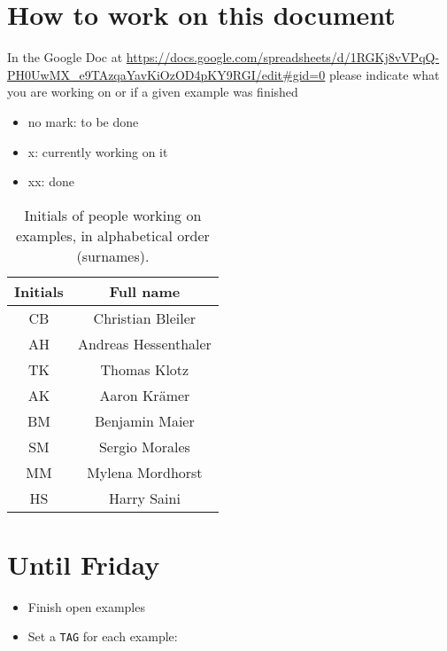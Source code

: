 %
\section{How to work on this document}
%
In the Google Doc at
\url{https://docs.google.com/spreadsheets/d/1RGKj8vVPqQ-PH0UwMX_e9TAzqaYavKiOzOD4pKY9RGI/edit#gid=0}
please indicate what you are working on or if a given example was finished
%
\begin{itemize}
    \item{no mark: to be done}
    \item{x: currently working on it}
    \item{xx: done}
\end{itemize}
%
\begin{table}[h!]
    \centering
    \begin{tabular}{ c | c }
        Initials & Full name \\
        \midrule
        CB       & Christian Bleiler \\
        AH       & Andreas Hessenthaler \\
        TK       & Thomas Klotz \\
        AK       & Aaron Kr\"amer \\
        BM       & Benjamin Maier \\
        SM       & Sergio Morales \\
        MM       & Mylena Mordhorst \\
        HS       & Harry Saini \\
    \end{tabular}
    \caption{Initials of people working on examples, in alphabetical order (surnames).}
    \label{initials-tab}
\end{table}

\section{Until Friday}
%
\begin{itemize}
     \item{Finish open examples}
     \item{Set a \texttt{TAG} for each example:}
\end{itemize}

